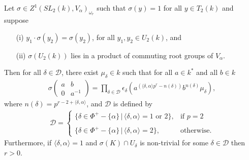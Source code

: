 \begin{lemma}\label{lem:second}
Let $\sigma\in Z^1(SL_2(k), V_\alpha)_{\omega_r}$ such that $\sigma(y) = 1$ for all $y\in T_2(k)$ and suppose
\begin{itemize}
	\item[(i)] $y_1 \cdot \sigma\left(y_2\right) = \sigma\left(y_2\right)$, for all $y_1,y_2 \in U_2(k)$, and
	\item[(ii)] $\sigma\left(U_2(k)\right)$ lies in a product of commuting root groups of $V_\alpha$.
\end{itemize}
Then for all $\delta \in \mathcal{D}$, there exist $\mu_\delta\in k$ such that for all $a\in k^*$ and all $b\in k$
\begin{align*}
\sigma\left(\begin{matrix}a & b\\0 & a^{-1}\end{matrix}\right) = \prod_{\delta\in\mathcal{D}} \epsilon_\delta\left(a^{(\langle\delta,\alpha\rangle p^r - n(\delta))}b^{n(\delta)}\mu_\delta\right),
\end{align*}
where $n(\delta) = p^{r-2+\langle\delta,\alpha\rangle}$, and $\mathcal{D}$ is defined by
\begin{align*}
	\mathcal{D} = \left\{ \begin{array}{ll}
		\{\delta \in \Phi^+ - \{\alpha\}\,|\, \langle \delta, \alpha \rangle = 1\textrm{ or }2\}, & \textrm{if } p = 2 \\ \\
		\{\delta \in \Phi^+ - \{\alpha\}\,|\, \langle \delta, \alpha \rangle = 2\}, & \textrm{otherwise}.
	\end{array}\right.
\end{align*}
Furthermore, if $\langle\delta, \alpha\rangle=1$ and $\sigma(K)\cap U_\delta$ is non-trivial for some $\delta \in \mathcal{D}$ then $r>0$.
\end{lemma}
